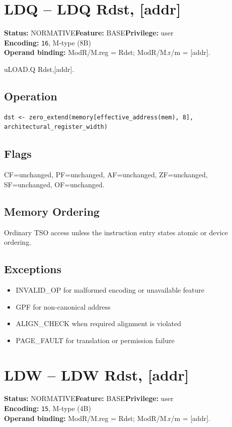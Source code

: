 \documentclass[10pt]{article}
\begin{document}
\section{LDQ -- LDQ Rdst, [addr]}
\textbf{Status:} NORMATIVE\quad \textbf{Feature:} BASE\quad \textbf{Privilege:} user\\
\textbf{Encoding:} \texttt{16}, M-type (8B)\\
\textbf{Operand binding:} ModR/M.reg = Rdst; ModR/M.r/m = [addr].

uLOAD.Q Rdst,[addr].

\subsection*{Operation}
\begin{lstlisting}
dst <- zero_extend(memory[effective_address(mem), 8], architectural_register_width)
\end{lstlisting}
\subsection*{Flags}
CF=unchanged, PF=unchanged, AF=unchanged, ZF=unchanged, SF=unchanged, OF=unchanged.
\subsection*{Memory Ordering}
Ordinary TSO access unless the instruction entry states atomic or device ordering.
\subsection*{Exceptions}
\begin{itemize}
\item INVALID\_OP for malformed encoding or unavailable feature
\item GPF for non-canonical address
\item ALIGN\_CHECK when required alignment is violated
\item PAGE\_FAULT for translation or permission failure
\end{itemize}
\clearpage

\section{LDW -- LDW Rdst, [addr]}
\textbf{Status:} NORMATIVE\quad \textbf{Feature:} BASE\quad \textbf{Privilege:} user\\
\textbf{Encoding:} \texttt{15}, M-type (4B)\\
\textbf{Operand binding:} ModR/M.reg = Rdst; ModR/M.r/m = [addr].
\end{document}
